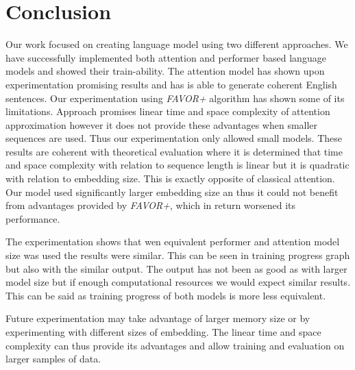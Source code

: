 \section{Conclusion}
Our work focused on creating language model using two different approaches. We have successfully implemented both attention and performer based language models and showed their train-ability. The attention model has shown upon experimentation promising results and has is able to generate coherent English sentences. Our experimentation using \textit{FAVOR+} algorithm has shown some of its limitations. Approach promises linear time and space complexity of attention approximation however it does not provide these advantages when smaller sequences are used. Thus our experimentation only allowed small models. These results are coherent with theoretical evaluation  where it is determined that time and space complexity with relation to sequence length is linear but it is quadratic with relation to embedding size. This is exactly opposite of classical attention. Our model used significantly larger embedding size an thus it could not benefit from advantages provided by \textit{FAVOR+}, which in return worsened its performance. 

The experimentation shows that wen equivalent performer and attention model size was used the results were similar. This can be seen in training progress graph but also with the similar output. The output has not been as good as with larger model size but if enough computational resources we would expect similar results. This can be said as training progress of both models is more less equivalent. 

Future experimentation may take advantage of larger memory size or by experimenting with different sizes of embedding. The linear time and space complexity can thus provide its advantages and allow training and evaluation on larger samples of data. 
